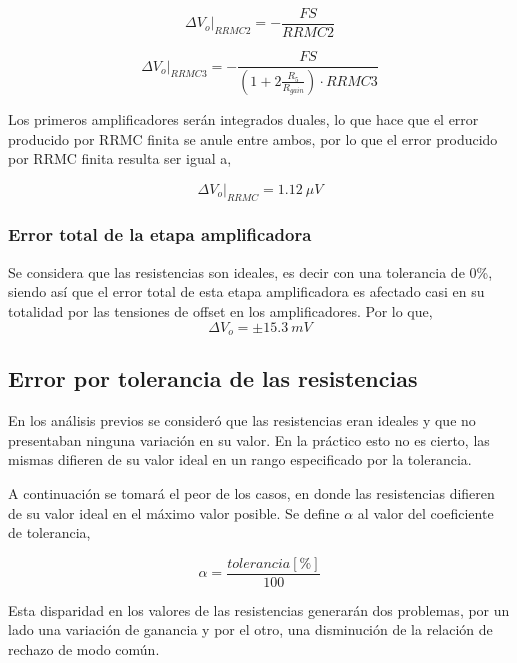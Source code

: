 \documentclass[12pt,A4paper,titlepage]{article}
\begin{document}
\begin{equation}
    \Delta V_o|_{RRMC2} = - \frac{FS}{RRMC2}
\end{equation}

\begin{equation}
    \Delta V_o|_{RRMC3} = - \frac{FS}{\left(1 + 2 \frac{R_5}{R_{gain}}\right) \cdot RRMC3}
\end{equation}

\bigskip
\hspace{1mm} Los primeros amplificadores serán integrados duales, lo que hace que el error producido por RRMC finita se anule entre ambos, por lo que el error producido por RRMC finita resulta ser igual a,

\begin{equation}
    \Delta V_o|_{RRMC} = 1.12~\mu V
\end{equation}

\subsubsection{\textbf{Error total de la etapa amplificadora}}
\hspace{1mm} Se considera que las resistencias son ideales, es decir con una tolerancia de 0\%, siendo así que el error total de esta etapa amplificadora es afectado casi en su totalidad por las tensiones de offset en los amplificadores. Por lo que,
\begin{equation}
    \Delta V_o = \pm 15.3~mV
\end{equation}

\subsection{Error por tolerancia de las resistencias}
\hspace{1mm} En los análisis previos se consideró que las resistencias eran ideales y que no presentaban ninguna variación en su valor. En la práctico esto no es cierto, las mismas difieren de su valor ideal en un rango especificado por la tolerancia. 

A continuación se tomará el peor de los casos, en donde las resistencias difieren de su valor ideal en el máximo valor posible. Se define \(\alpha \) al valor del coeficiente de tolerancia,

\begin{equation}
    \alpha = \frac{tolerancia[\%]}{100}
\end{equation}


\bigskip
Esta disparidad en los valores de las resistencias generarán dos problemas, por un lado una variación de ganancia y por el otro, una disminución de la relación de rechazo de modo común.
\end{document}
